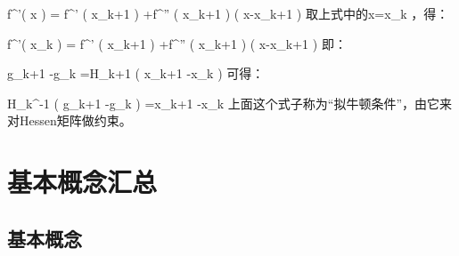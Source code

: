 \documentclass[11pt]{book}
\newcounter{#2}
\newcounter{#2}[#1]
\numberwithin{#2}{#1}
\begin{document}
f^{'}\left( x \right) = f^{'} \left( x_{k+1} \right) +f^{''} \left( x_{k+1} \right) \left( x-x_{k+1} \right)
取上式中的x=x_{k} ，得：

f^{'}\left( x_{k}  \right) = f^{'} \left( x_{k+1} \right) +f^{''} \left( x_{k+1} \right) \left( x-x_{k+1} \right)
即：

g_{k+1} -g_{k} =H_{k+1} \cdot \left( x_{k+1} -x_{k}  \right) 
可得：

H_{k}^{-1} \cdot \left( g_{k+1} -g_{k}  \right) =x_{k+1} -x_{k}
上面这个式子称为“拟牛顿条件”，由它来对Hessen矩阵做约束。

	\chapter{基本概念汇总}
	\section{基本概念}
\end{document}
